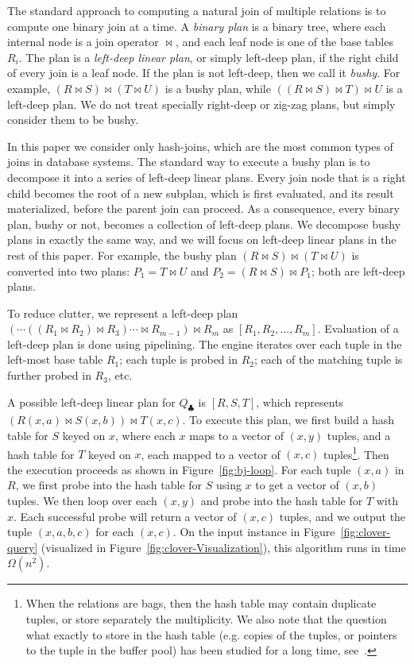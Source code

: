 The standard approach to computing a natural join of multiple relations is
to compute one binary join at a time.  A {\em binary plan} is a binary
tree, where each internal node is a join operator $\Join$, and each
leaf node is one of the base tables $R_i$.
The plan is a \emph{left-deep linear plan}, or
simply left-deep plan, if the right child of every join is a leaf
node.  If the plan is not left-deep, then we call it \emph{bushy}.
For example, $(R \Join S) \Join (T \Join U)$ is a bushy plan, while
$((R \Join S) \Join T) \Join U$ is a left-deep plan.  We do not treat
specially right-deep or zig-zag plans, but simply consider them to be
bushy.

In this paper we consider only hash-joins, which are the most
common types of joins in database systems.
The standard way to execute a bushy plan is to
decompose it into a series of left-deep linear plans.  Every join node
that is a right child becomes the root of a new subplan, which is
first evaluated, and its result materialized, before the parent join
can proceed.  As a consequence, every binary plan, bushy or not,
becomes a collection of left-deep plans. We decompose bushy
plans in exactly the same way, and we will focus on left-deep linear
plans in the rest of this paper.  For example, the bushy plan
$(R \Join S) \Join (T \Join U)$ is converted into two plans:
$P_1 = T \Join U$ and $P_2 = (R \Join S) \Join P_1$; both are
left-deep plans.

To reduce clutter, we represent a left-deep plan
$(\cdots ((R_1 \Join R_2) \Join R_3) \cdots \Join R_{m-1}) \Join R_m$
as $[R_1, R_2, \ldots, R_m]$.  Evaluation of a left-deep plan is done
using pipelining.  The engine iterates over each tuple in the
left-most base table $R_1$; each tuple is probed in $R_2$; each of the
matching tuple is further probed in $R_3$, etc.


\begin{example}
  A possible left-deep linear plan for $Q_\clubsuit$ is $[R, S, T]$,
  which represents $\left(R(x,a) \Join S(x,b)\right) \Join T(x,c)$.  To execute
  this plan, we first build a hash table for $S$ keyed on $x$,
  where each $x$ maps to a vector of $(x,y)$ tuples,
  and a hash table for $T$ keyed on $x$, each mapped to a
  vector of $(x,c)$ tuples\footnote{When the relations are bags, then
    the hash table may contain duplicate tuples, or store separately
    the multiplicity.  We also note that the question what exactly to
    store in the hash table (e.g. copies of the tuples, or pointers to
    the tuple in the buffer pool) has been studied for a long time,
    see~\cite{DBLP:journals/csur/Graefe93}.}.
  Then the execution
  proceeds as shown in Figure~\ref{fig:bj-loop}.
  For each tuple $(x, a)$ in $R$, we first probe into the hash table for $S$
  using $x$ to get a vector of $(x, b)$ tuples.  We then loop over
  each $(x, y)$ and probe into the hash table for $T$ with $x$.
  Each successful probe will return a vector of $(x, c)$ tuples,
  and we output the tuple $(x, a, b, c)$ for each $(x, c)$.
  On the input instance in Figure~\ref{fig:clover-query}
  (visualized in Figure~\ref{fig:clover-Visualization}),
  this algorithm runs in time $\Omega(n^2)$.
\end{example}

